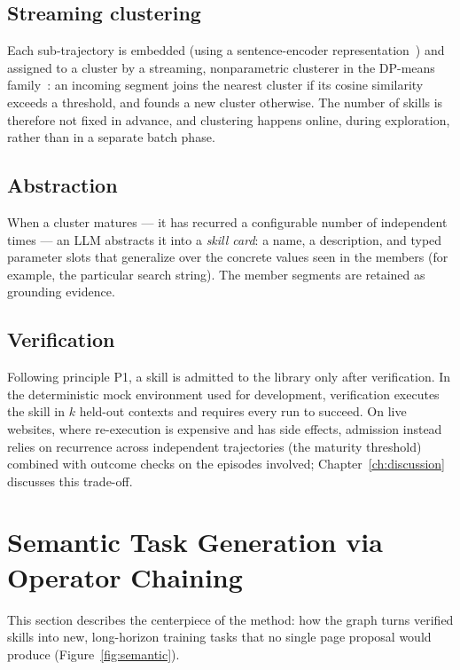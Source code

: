 \subsection{Streaming clustering}

Each sub-trajectory is embedded (using a sentence-encoder
representation~\cite{reimers2019sbert}) and assigned to a cluster by a
streaming, nonparametric clusterer in the DP-means
family~\cite{kulis2012dpmeans}: an incoming segment joins the nearest cluster
if its cosine similarity exceeds a threshold, and founds a new cluster
otherwise. The number of skills is therefore not fixed in advance, and
clustering happens online, during exploration, rather than in a separate
batch phase.

\subsection{Abstraction}

When a cluster matures --- it has recurred a configurable number of
independent times --- an LLM abstracts it into a \emph{skill card}: a name, a
description, and typed parameter slots that generalize over the concrete
values seen in the members (for example, the particular search string). The
member segments are retained as grounding evidence.

\subsection{Verification}

Following principle P1, a skill is admitted to the library only after
verification. In the deterministic mock environment used for development,
verification executes the skill in $k$ held-out contexts and requires every
run to succeed. On live websites, where re-execution is expensive and has
side effects, admission instead relies on recurrence across independent
trajectories (the maturity threshold) combined with outcome checks on the
episodes involved; Chapter~\ref{ch:discussion} discusses this trade-off.

\section{Semantic Task Generation via Operator Chaining}
\label{sec:method-semantic}

This section describes the centerpiece of the method: how the graph turns
verified skills into new, long-horizon training tasks that no single page
proposal would produce (Figure~\ref{fig:semantic}).

